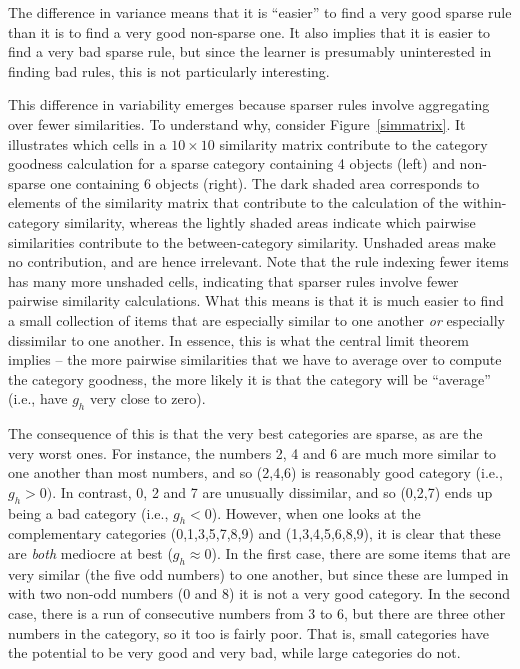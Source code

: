 \documentclass{apa}
\begin{document}
 The difference in variance means that it is ``easier'' to find a very good sparse rule than it is to find a very good non-sparse one. It also implies that it is easier to find a very bad sparse rule, but since the learner is presumably uninterested in finding bad rules, this is not particularly interesting.


This difference in variability emerges because sparser rules involve aggregating over fewer similarities.  To understand why, consider Figure~\ref{simmatrix}. It illustrates which cells in a $10 \times 10$ similarity matrix contribute to the category goodness calculation for a sparse category containing 4 objects (left) and non-sparse one containing 6 objects (right). The dark shaded area corresponds to elements of the similarity matrix that contribute to the calculation of the within-category similarity, whereas the lightly shaded areas indicate which pairwise similarities contribute to the between-category similarity. Unshaded areas make no contribution, and are hence irrelevant. Note that the rule indexing fewer items has many more unshaded cells, indicating that sparser rules involve fewer pairwise similarity calculations. What this means is that it is much easier to find a small collection of items that are especially similar to one another {\it or} especially dissimilar to one another. In essence, this is what the central limit theorem implies -- the more pairwise similarities that we have to average over to compute the category goodness, the more likely it is that the category will be ``average'' (i.e., have $g_h$ very close to zero).

The consequence of this is that the very best categories are sparse, as are the very worst ones. For instance, the numbers 2, 4 and 6 are much more similar to one another than most numbers, and so (2,4,6) is reasonably good category (i.e., $g_h > 0)$. In contrast, 0, 2 and 7 are unusually dissimilar, and so (0,2,7) ends up being a bad category (i.e., $g_h < 0$). However, when one looks at the complementary categories (0,1,3,5,7,8,9) and (1,3,4,5,6,8,9), it is clear that these are {\it both} mediocre at best ($g_h \approx 0$). In the first case, there are some items that are very similar (the five odd numbers) to one another, but since these are lumped in with two non-odd numbers (0 and 8) it is not a very good category. In the second case, there is a run of consecutive numbers from 3 to 6, but there are three other numbers in the category, so it too is fairly poor. That is, small categories have the potential to be very good and very bad, while large categories do not.
\end{document}
